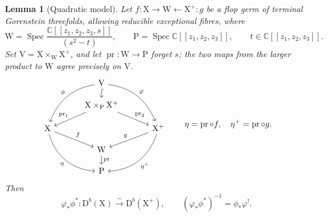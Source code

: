 \documentclass[a4paper,10pt]{article}
\newcommand{\X}{\mathrm{X}}
\newcommand{\W}{\mathrm{W}}
\newcommand{\V}{\mathrm{V}}
\newcommand{\Pj}{\mathrm{P}}
\newcommand{\Db}{\mathrm{D}^b}
\newcommand{\Spec}{\operatorname{Spec}}
\newtheorem{lemma}{Lemma}
\theoremstyle{remark}
\theoremstyle{plain}
\begin{document}
\begin{lemma}[Quadratic model]\label{lem:quadratic}
Let $f:\X\to\W\leftarrow\X^+:g$ be a flop germ of terminal
Gorenstein threefolds, allowing reducible exceptional fibres, where
\[
\W=\Spec\frac{\mathds{C}[[z_1,z_2,z_3,s]]}{(s^2-t)},
\qquad
\Pj=\Spec\mathds{C}[[z_1,z_2,z_3]],
\qquad t\in\mathds{C}[[z_1,z_2,z_3]].
\]
Set $\V=\X\times_\W\X^+$, and let
$\operatorname{pr}:\W\to\Pj$ forget $s$; the two maps from the larger
product to $\W$ agree precisely on $\V$.
\[
\begin{tikzcd}[column sep=3.2em,row sep=1.1em]
&\V\arrow[ddl,bend right=30,"\phi"']
\arrow[d,hook]\arrow[ddr,bend left=30,"\varphi"]&\\
&\X\times_\Pj\X^+
\arrow[dl,"\operatorname{pr}_1"']
\arrow[dr,"\operatorname{pr}_2"]&\\
\X\arrow[dr,"f"]
\arrow[ddr,bend right=35,"\eta"']
&&\X^+\arrow[dl,"g"']
\arrow[ddl,bend left=35,"\eta^+"]\\
&\W\arrow[d,"\operatorname{pr}"]&\\
&\Pj&
\end{tikzcd}
\qquad
\eta=\operatorname{pr}\circ f,\quad
\eta^+=\operatorname{pr}\circ g.
\]
Then
\begin{equation}\label{eq:equivalence}
\varphi_*\phi^*:\Db(\X)\xrightarrow{\sim}\Db(\X^+),
\qquad
(\varphi_*\phi^*)^{-1}=\phi_*\varphi^!.
\end{equation}
\end{lemma}
\end{document}
